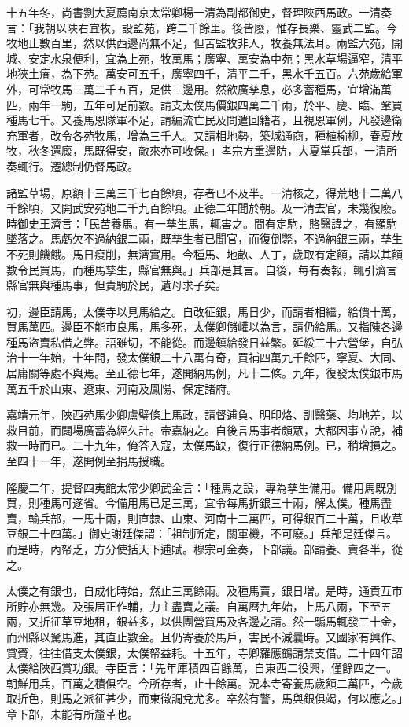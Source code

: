十五年冬，尚書劉大夏薦南京太常卿楊一清為副都御史，督理陜西馬政。一清奏言：「我朝以陜右宜牧，設監苑，跨二千餘里。後皆廢，惟存長樂、靈武二監。今牧地止數百里，然以供西邊尚無不足，但苦監牧非人，牧養無法耳。兩監六苑，開城、安定水泉便利，宜為上苑，牧萬馬；廣寧、萬安為中苑；黑水草場逼窄，清平地狹土瘠，為下苑。萬安可五千，廣寧四千，清平二千，黑水千五百。六苑歲給軍外，可常牧馬三萬二千五百，足供三邊用。然欲廣孳息，必多蓄種馬，宜增滿萬匹，兩年一駒，五年可足前數。請支太僕馬價銀四萬二千兩，於平、慶、臨、鞏買種馬七千。又養馬恩隊軍不足，請編流亡民及問遣回籍者，且視恩軍例，凡發邊衛充軍者，改令各苑牧馬，增為三千人。又請相地勢，築城通商，種植榆柳，春夏放牧，秋冬還廄，馬既得安，敵來亦可收保。」孝宗方重邊防，大夏掌兵部，一清所奏輒行。遷總制仍督馬政。

諸監草場，原額十三萬三千七百餘頃，存者已不及半。一清核之，得荒地十二萬八千餘頃，又開武安苑地二千九百餘頃。正德二年聞於朝。及一清去官，未幾復廢。時御史王濟言：「民苦養馬。有一孳生馬，輒害之。間有定駒，賂醫諱之，有顯駒墜落之。馬虧欠不過納銀二兩，既孳生者已聞官，而復倒斃，不過納銀三兩，孳生不死則饑餓。馬日瘦削，無濟實用。今種馬、地畝、人丁，歲取有定額，請以其額數令民買馬，而種馬孳生，縣官無與。」兵部是其言。自後，每有奏報，輒引濟言縣官無與種馬事，但責駒於民，遺母求子矣。

初，邊臣請馬，太僕寺以見馬給之。自改征銀，馬日少，而請者相繼，給價十萬，買馬萬匹。邊臣不能市良馬，馬多死，太僕卿儲巏以為言，請仍給馬。又指陳各邊種馬盜賣私借之弊。語雖切，不能從。而邊鎮給發日益繁。延綏三十六營堡，自弘治十一年始，十年間，發太僕銀二十八萬有奇，買補四萬九千餘匹，寧夏、大同、居庸關等處不與焉。至正德七年，遂開納馬例，凡十二條。九年，復發太僕銀市馬萬五千於山東、遼東、河南及鳳陽、保定諸府。

嘉靖元年，陜西苑馬少卿盧璧條上馬政，請督逋負、明印烙、訓醫藥、均地差，以救目前，而闢場廣蓄為經久計。帝嘉納之。自後言馬事者頗眾，大都因事立說，補救一時而已。二十九年，俺答入寇，太僕馬缺，復行正德納馬例。已，稍增損之。至四十一年，遂開例至捐馬授職。

隆慶二年，提督四夷館太常少卿武金言：「種馬之設，專為孳生備用。備用馬既別買，則種馬可遂省。今備用馬已足三萬，宜令每馬折銀三十兩，解太僕。種馬盡賣，輸兵部，一馬十兩，則直隸、山東、河南十二萬匹，可得銀百二十萬，且收草豆銀二十四萬。」御史謝廷傑謂：「祖制所定，關軍機，不可廢。」兵部是廷傑言。而是時，內帑乏，方分使括天下逋賦。穆宗可金奏，下部議。部請養、賣各半，從之。

太僕之有銀也，自成化時始，然止三萬餘兩。及種馬賣，銀日增。是時，通貢互市所貯亦無幾。及張居正作輔，力主盡賣之議。自萬曆九年始，上馬八兩，下至五兩，又折征草豆地租，銀益多，以供團營買馬及各邊之請。然一騸馬輒發三十金，而州縣以駑馬進，其直止數金。且仍寄養於馬戶，害民不減曩時。又國家有興作、賞賚，往往借支太僕銀，太僕帑益耗。十五年，寺卿羅應鶴請禁支借。二十四年詔太僕給陜西賞功銀。寺臣言：「先年庫積四百餘萬，自東西二役興，僅餘四之一。朝鮮用兵，百萬之積俱空。今所存者，止十餘萬。況本寺寄養馬歲額二萬匹，今歲取折色，則馬之派征甚少，而東徵調兌尤多。卒然有警，馬與銀俱竭，何以應之。」章下部，未能有所釐革也。

